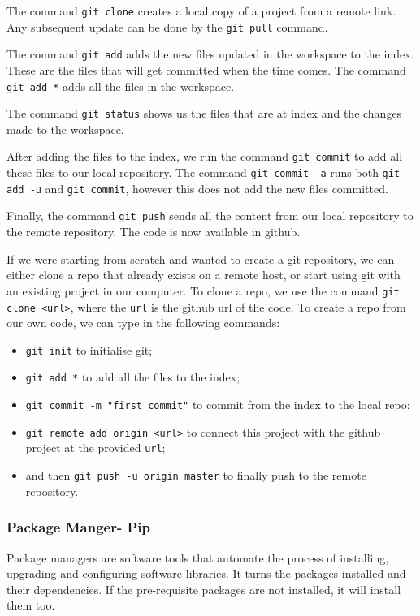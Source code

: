 \documentclass[a4paper, openany]{memoir}
\begin{document}
    \noindent The command \texttt{git clone} creates a local copy of a project from a remote link. Any subsequent update can be done by the \texttt{git pull} command.

    \noindent The command \texttt{git add} adds the new files updated in the workspace to the index. These are the files that will get committed when the time comes. The command \texttt{git add *} adds all the files in the workspace.

    \noindent The command \texttt{git status} shows us the files that are at index and the changes made to the workspace.

    \noindent After adding the files to the index, we run the command \texttt{git commit} to add all these files to our local repository. The command \texttt{git commit -a} runs both \texttt{git add -u} and \texttt{git commit}, however this does not add the new files committed.

    \noindent Finally, the command \texttt{git push} sends all the content from our local repository to the remote repository. The code is now available in github.

    \noindent If we were starting from scratch and wanted to create a git repository, we can either clone a repo that already exists on a remote host, or start using git with an existing project in our computer. To clone a repo, we use the command \texttt{git clone <url>}, where the \texttt{url} is the github url of the code. 
    To create a repo from our own code, we can type in the following commands:
    \begin{itemize}
        \item \texttt{git init} to initialise git; 
        \item \texttt{git add *} to add all the files to the index;
        \item \texttt{git commit -m "first commit"} to commit from the index to the local repo;
        \item \texttt{git remote add origin <url>} to connect this project with the github project at the provided \texttt{url}; 
        \item and then \texttt{git push -u origin master} to finally push to the remote \newline repository.
    \end{itemize}

    \subsubsection{Package Manger- Pip}
    Package managers are software tools that automate the process of installing, upgrading and configuring software libraries. It turns the packages installed and their dependencies. If the pre-requisite packages are not installed, it will install them too. 
\end{document}
